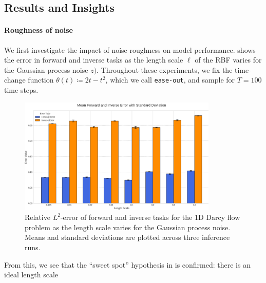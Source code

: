 \subsection{Results and Insights}
\paragraph{Roughness of noise}
We first investigate the impact of noise roughness on model performance.  shows the error in forward and inverse tasks as the length scale \(\ell\) of the RBF varies for the Gaussian process noise \(z)\). Throughout these experiments, we fix the time-change function \(\theta(t) \coloneqq 2t -t^{2}\), which we call \texttt{ease-out}, and sample for \(T=100\) time steps.

\begin{figure}
\centering
\includegraphics[height=15em]{len_darcy_1d.png}
\caption{Relative \(L^{2}\)-error of forward and inverse tasks for the 1D Darcy flow problem as the length scale  varies for the Gaussian process noise. Means and standard deviations are plotted across three inference runs.}\label{fig:d1dlen}
\end{figure}

From this, we see that the ``sweet spot'' hypothesis in  is confirmed: there is an ideal length scale


